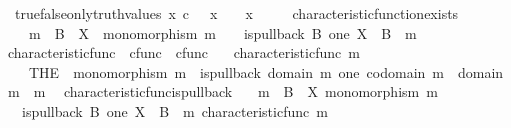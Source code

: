 \begin{isabellebody}
\ \ true{\isacharunderscore}{\kern0pt}false{\isacharunderscore}{\kern0pt}only{\isacharunderscore}{\kern0pt}truth{\isacharunderscore}{\kern0pt}values{\isacharcolon}{\kern0pt}\ {\isachardoublequoteopen}x\ {\isasymin}\isactrlsub c\ {\isasymOmega}\ {\isasymLongrightarrow}\ x\ {\isacharequal}{\kern0pt}\ {\isasymf}\ {\isasymor}\ x\ {\isacharequal}{\kern0pt}\ {\isasymt}{\isachardoublequoteclose}\ \isanewline
\ \ characteristic{\isacharunderscore}{\kern0pt}function{\isacharunderscore}{\kern0pt}exists{\isacharcolon}{\kern0pt}\isanewline
\ \ \ \ {\isachardoublequoteopen}m\ {\isacharcolon}{\kern0pt}\ B\ {\isasymrightarrow}\ X\ {\isasymLongrightarrow}\ monomorphism\ m\ {\isasymLongrightarrow}\ {\isasymexists}{\isacharbang}{\kern0pt}\ {\isasymchi}{\isachardot}{\kern0pt}\ is{\isacharunderscore}{\kern0pt}pullback\ B\ one\ X\ {\isasymOmega}\ {\isacharparenleft}{\kern0pt}{\isasymbeta}\isactrlbsub B\isactrlesub {\isacharparenright}{\kern0pt}\ {\isasymt}\ m\ {\isasymchi}{\isachardoublequoteclose}\isanewline
\isanewline
{}\isamarkupfalse%
\ characteristic{\isacharunderscore}{\kern0pt}func\ {\isacharcolon}{\kern0pt}{\isacharcolon}{\kern0pt}\ {\isachardoublequoteopen}cfunc\ {\isasymRightarrow}\ cfunc{\isachardoublequoteclose}\ \isanewline
\ \ {\isachardoublequoteopen}characteristic{\isacharunderscore}{\kern0pt}func\ m\ {\isacharequal}{\kern0pt}\isanewline
\ \ \ \ {\isacharparenleft}{\kern0pt}THE\ {\isasymchi}{\isachardot}{\kern0pt}\ monomorphism\ m\ {\isasymlongrightarrow}\ is{\isacharunderscore}{\kern0pt}pullback\ {\isacharparenleft}{\kern0pt}domain\ m{\isacharparenright}{\kern0pt}\ one\ {\isacharparenleft}{\kern0pt}codomain\ m{\isacharparenright}{\kern0pt}\ {\isasymOmega}\ {\isacharparenleft}{\kern0pt}{\isasymbeta}\isactrlbsub domain\ m\isactrlesub {\isacharparenright}{\kern0pt}\ {\isasymt}\ m\ {\isasymchi}{\isacharparenright}{\kern0pt}{\isachardoublequoteclose}\isanewline
\isanewline
{}\isamarkupfalse%
\ characteristic{\isacharunderscore}{\kern0pt}func{\isacharunderscore}{\kern0pt}is{\isacharunderscore}{\kern0pt}pullback{\isacharcolon}{\kern0pt}\isanewline
\ \ \ {\isachardoublequoteopen}m\ {\isacharcolon}{\kern0pt}\ B\ {\isasymrightarrow}\ X{\isachardoublequoteclose}\ {\isachardoublequoteopen}monomorphism\ m{\isachardoublequoteclose}\isanewline
\ \ \ {\isachardoublequoteopen}is{\isacharunderscore}{\kern0pt}pullback\ B\ one\ X\ {\isasymOmega}\ {\isacharparenleft}{\kern0pt}{\isasymbeta}\isactrlbsub B\isactrlesub {\isacharparenright}{\kern0pt}\ {\isasymt}\ m\ {\isacharparenleft}{\kern0pt}characteristic{\isacharunderscore}{\kern0pt}func\ m{\isacharparenright}{\kern0pt}{\isachardoublequoteclose}\isanewline

\end{isabellebody}
